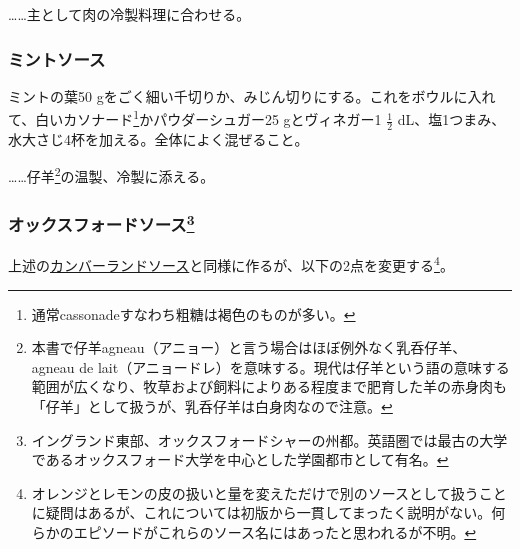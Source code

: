 \begin{recette}
\ldots{}\ldots{}主として肉の冷製料理に合わせる。

\hypertarget{mint-sauce}{%
\subsubsection{ミントソース}\label{mint-sauce}}



ミントの葉50
gをごく細い千切りか、みじん切りにする。これをボウルに入れて、白いカソナード\footnote{通常cassonadeすなわち粗糖は褐色のものが多い。}かパウダーシュガー25
gとヴィネガー1 \(\frac{1}{2}\)
dL、塩1つまみ、水大さじ4杯を加える。全体によく混ぜること。

\ldots{}\ldots{}仔羊\footnote{本書で仔羊agneau（アニョー）と言う場合はほぼ例外なく乳呑仔羊、
  agneau de
  lait（アニョードレ）を意味する。現代は仔羊という語の意味する範囲が広くなり、牧草および飼料によりある程度まで肥育した羊の赤身肉も「仔羊」として扱うが、乳呑仔羊は白身肉なので注意。}の温製、冷製に添える。

\hypertarget{oxford-sauce}{%
\subsubsection[オックスフォードソース]{\texorpdfstring{オックスフォードソース\footnote{イングランド東部、オックスフォードシャーの州都。英語圏では最古の大学であるオックスフォード大学を中心とした学園都市として有名。}}{オックスフォードソース}}\label{oxford-sauce}}


上述の\protect\hyperlink{cumberland-sauce}{カンバーランドソース}と同様に作るが、以下の2点を変更する\footnote{オレンジとレモンの皮の扱いと量を変えただけで別のソースとして扱うことに疑問はあるが、これについては初版から一貫してまったく説明がない。何らかのエピソードがこれらのソース名にはあったと思われるが不明。}。


\end{recette}
